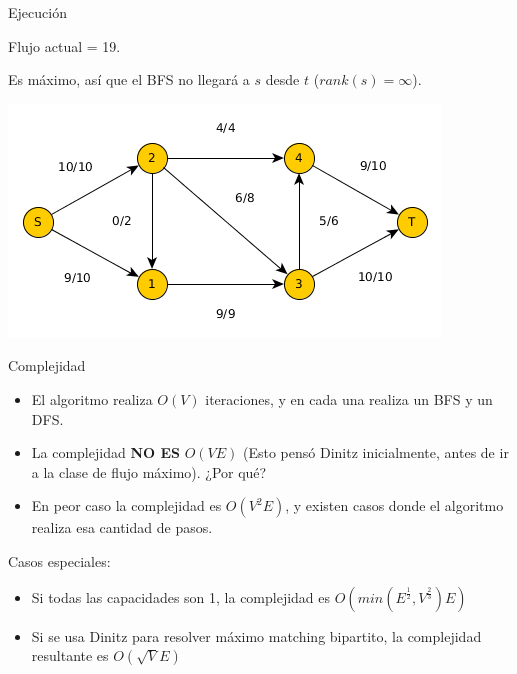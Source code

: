 \documentclass{beamer}
\begin{document}
\begin{frame}{Ejecución}

    Flujo actual = 19.
    
    Es máximo, así que el BFS no llegará a $s$ desde $t$ ($rank(s)=\infty$).
    
    \includegraphics[scale=0.6]{dinitz/dinitz27.png}
    
\end{frame}

\begin{frame}{Complejidad}
    \begin{itemize}
        \item El algoritmo realiza $O(V)$ iteraciones, y en cada una realiza un BFS y un DFS.
        \item La complejidad \textbf{NO ES} $O(VE)$ (Esto pensó Dinitz inicialmente, antes de ir a la clase de flujo máximo). ¿Por qué?
        \item En peor caso la complejidad es $O(V^2 E)$, y existen casos donde el algoritmo realiza esa cantidad de pasos.
    \end{itemize}
    \pause
    Casos especiales:
    \begin{itemize}
        \item Si todas las capacidades son 1, la complejidad es $O(min(E^{\frac{1}{2}}, V^{\frac{2}{3}}) E)$
        \item Si se usa Dinitz para resolver máximo matching bipartito, la complejidad resultante es $O(\sqrt{V} E)$
    \end{itemize}
\end{frame}
\end{document}
